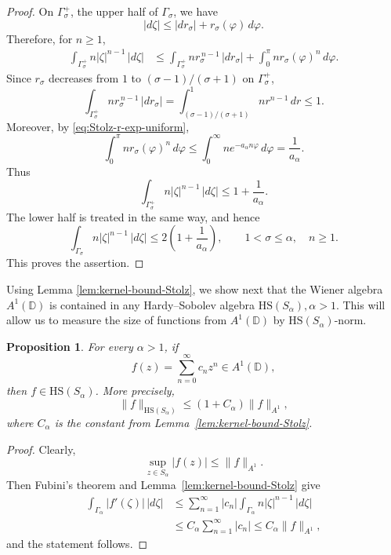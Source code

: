 \documentclass[11pt]{amsart}
\numberwithin{equation}{section}
\newtheorem{proposition}[theorem]{Proposition}
\theoremstyle{definition}
\theoremstyle{plain}
\def\D{\mathbb{D}}
\newcommand{\HS}{\mathrm{HS}}
\begin{document}
\begin{proof}
On $\Gamma_\sigma^+$, the upper half of \(\Gamma_\sigma\), we have 
\[
        |d\zeta|
        \le
        |dr_\sigma|+r_\sigma(\varphi)\,d\varphi .
\]
Therefore, for \(n\ge1\),
\[
\begin{aligned}
 \int_{\Gamma_\sigma^+} n|\zeta|^{n-1}\,|d\zeta|
 &\le
 \int_{\Gamma_\sigma^+} n r_\sigma^{\,n-1}\,|dr_\sigma|
 +
 \int_0^\pi n r_\sigma(\varphi)^n\,d\varphi .
\end{aligned}
\]
Since \(r_\sigma\) decreases from \(1\) to \((\sigma-1)/(\sigma+1)\) on $\Gamma_\sigma^+$,
\[
        \int_{\Gamma_\sigma^+} n r_\sigma^{\,n-1}\,|dr_\sigma|
        =
        \int_{(\sigma-1)/(\sigma+1)}^1 n r^{n-1}\,dr
        \le 1 .
\]
Moreover, by \eqref{eq:Stolz-r-exp-uniform},
\[
        \int_0^\pi n r_\sigma(\varphi)^n\,d\varphi
        \le
        \int_0^\infty n e^{-a_\alpha n\varphi}\,d\varphi
        =
        \frac1{a_\alpha}.
\]
Thus
\[
        \int_{\Gamma_\sigma^+} n|\zeta|^{n-1}\,|d\zeta|
        \le
        1+\frac1{a_\alpha}.
\]
The lower half is treated in the same way, and hence
\[
        \int_{\Gamma_\sigma} n|\zeta|^{n-1}\,|d\zeta|
        \le
        2\left(1+\frac1{a_\alpha}\right),
        \qquad 1<\sigma\le\alpha,\quad n\ge1 .
\]
This proves the assertion.
\end{proof}

Using Lemma \ref{lem:kernel-bound-Stolz}, we show next 
that the Wiener algebra $A^1(\D)$ is contained in any Hardy--Sobolev algebra
$\HS(S_\alpha), \alpha>1.$ This will allow us to measure the size of functions
from $A^1(\D)$ by $\HS(S_\alpha)$-norm.

\begin{proposition}\label{prop:A1-HS}
For every \(\alpha>1\),
if
\[
        f(z)=\sum_{n=0}^\infty c_nz^n\in A^1(\D),
\]
then \(f\in\HS(S_\alpha)\). More precisely,
\[
        \|f\|_{\HS(S_\alpha)}
        \le (1+C_\alpha)\|f\|_{A^1},
\]
where \(C_\alpha\) is the constant from Lemma~\ref{lem:kernel-bound-Stolz}.
\end{proposition}

\begin{proof}
Clearly,
\[
        \sup_{z\in S_\alpha}|f(z)|\le \|f\|_{A^1} .
\]
Then  Fubini's theorem and
Lemma~\ref{lem:kernel-bound-Stolz} give
\[
\begin{aligned}
        \int_{\Gamma_\alpha}|f'(\zeta)|\,|d\zeta|
        &\le
        \sum_{n=1}^\infty |c_n|
        \int_{\Gamma_\alpha} n|\zeta|^{n-1}\,|d\zeta|       \\
        &\le
        C_\alpha\sum_{n=1}^\infty |c_n|
        \le C_\alpha\|f\|_{A^1},
\end{aligned}
\]
and the statement follows.
\end{proof}
\end{document}
